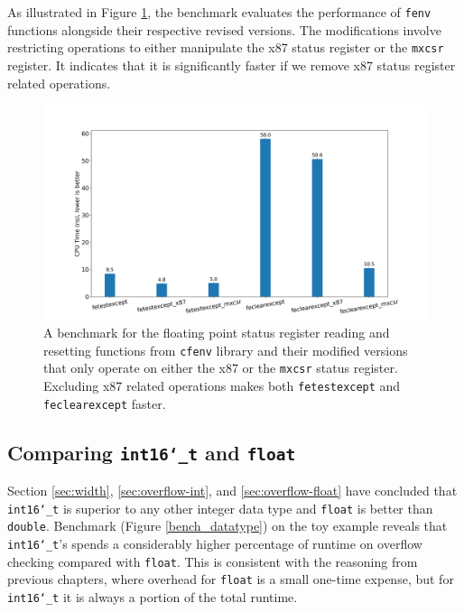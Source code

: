 \documentclass[logo,bsc,singlespacing,parskip]{infthesis}
\newcommand{\dtshort}{\texttt{int16\char`_t}}
\newcommand{\dtfloat}{\texttt{float}}
\newcommand{\dtdouble}{\texttt{double}}
\newcommand{\mxcsr}{\texttt{mxcsr}}
\newcommand{\xmm}{\texttt{XMM}}
\begin{document}

As illustrated in Figure \ref{plot_fenv}, the benchmark evaluates the
performance of \texttt{fenv} functions alongside their respective revised
versions. The modifications involve restricting operations to
either manipulate the x87 status register or the \mxcsr{} register. It
indicates that it is significantly faster if we remove x87 status register
related operations. 

\begin{figure}[H]\captionsetup{name=Figure}
    \begin{center}
    \includegraphics[width=\linewidth]{image/bench_fenv.png}
    \end{center}
    \caption{A benchmark for the floating point status register reading and
resetting functions from \texttt{cfenv} library and their modified versions that
only operate on either the x87 or the \mxcsr{} status register. Excluding x87
related operations makes both \texttt{fetestexcept} and \texttt{feclearexcept}
faster.}
    \label{plot_fenv}
\end{figure}
\normalsize

\subsection{Comparing \dtshort{} and \dtfloat{}}

Section \ref{sec:width}, \ref{sec:overflow-int}, and \ref{sec:overflow-float}
have concluded that \dtshort{} is superior to any other integer data type and
\dtfloat{} is better than \dtdouble{}. 
Benchmark (Figure \ref{bench_datatype}) on the toy example reveals that
\dtshort{}'s spends a considerably higher percentage of runtime on overflow
checking compared with \dtfloat{}. This is consistent with
the reasoning from previous chapters, where overhead for \dtfloat{} is a small
one-time expense, but for \dtshort{} it is always a portion of the total
runtime. 
\end{document}
